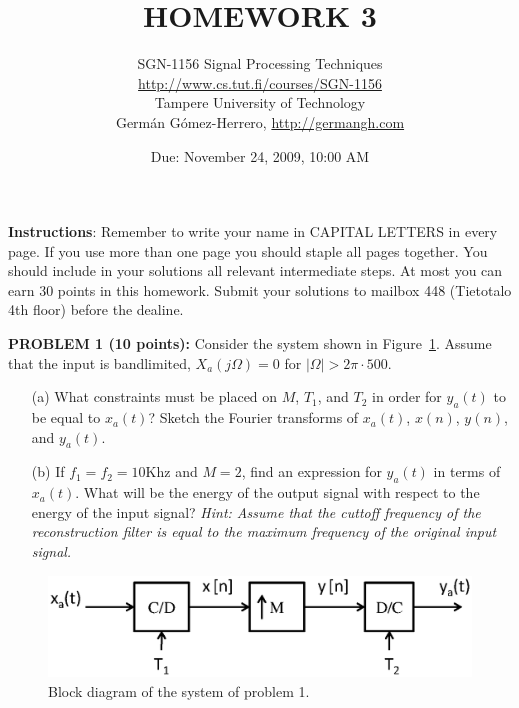 \documentclass[a4paper,11pt,oneside]{article}
\title{\large{\textbf{HOMEWORK 3}}}
\author{SGN-1156 Signal Processing Techniques\\
\url{http://www.cs.tut.fi/courses/SGN-1156}\\
Tampere University of Technology\\
Germ\'an G\'omez-Herrero, \url{http://germangh.com}}
\date{Due: November 24, 2009, 10:00 AM}
\begin{document}
\maketitle

\noindent \textbf{Instructions}: Remember to write your name in CAPITAL LETTERS in every page. If you use more than one page you should staple all pages together. You should include in your solutions all relevant intermediate steps. At most you can earn 30 points in this homework. Submit your solutions to mailbox 448 (Tietotalo 4th floor) before the dealine.
\vspace{1cm} 

\noindent \textbf{PROBLEM 1 (10 points):} Consider the system shown in Figure~\ref{fig1}. Assume that the input is bandlimited, $X_a(j\Omega)=0$ for $|\Omega|>2\pi\cdot 500$.

\begin{itemize}
\item[(a)] What constraints must be placed on $M$, $T_1$, and $T_{2}$ in order for $y_a(t)$ to be equal to $x_a(t)$? Sketch the Fourier transforms of $x_a(t)$, $x(n)$, $y(n)$, and $y_a(t)$.
\item[(b)] If $f_1=f_2=10$Khz and $M=2$, find an expression for $y_a(t)$ in terms of $x_a(t)$. What will be the energy of the output signal with respect to the energy of the input signal? \emph{Hint: Assume that the cuttoff frequency of the reconstruction filter is equal to the maximum frequency of the original input signal.}
\end{itemize}

\begin{figure}[h!]
\centering
\includegraphics[width=.8\textwidth]{fig1.eps}
\caption{Block diagram of the system of problem 1.}
\label{fig1}
\end{figure}
%


\vspace{2cm}
\end{document}
